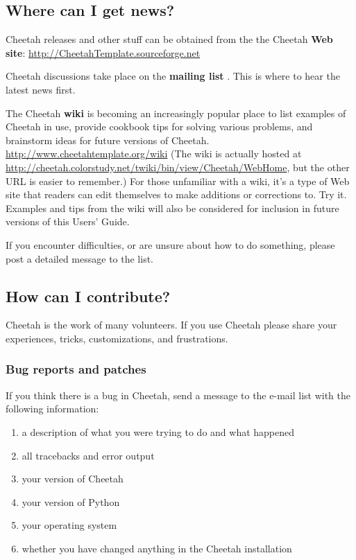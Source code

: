 \subsection{Where can I get news?}
\label{intro.news}

Cheetah releases and other stuff can be obtained from the the Cheetah 
{\bf Web site}:
\url{http://CheetahTemplate.sourceforge.net}

Cheetah discussions take place on the {\bf mailing list}
.  This is where to hear
the latest news first.

The Cheetah {\bf wiki} is becoming an increasingly popular place to list
examples of Cheetah in use, provide cookbook tips for solving various problems,
and brainstorm ideas for future versions of Cheetah.
\url{http://www.cheetahtemplate.org/wiki}
(The wiki is actually hosted at
\url{http://cheetah.colorstudy.net/twiki/bin/view/Cheetah/WebHome}, but the 
other URL is easier to remember.)
For those unfamiliar with a wiki, it's a type of Web site that readers can edit
themselves to make additions or corrections to.  Try it.  Examples and tips 
from the wiki will also be considered for inclusion in future versions of this
Users' Guide.

If you encounter difficulties, or are unsure about how to do something,
please post a detailed message to the list.  

\subsection{How can I contribute?}
\label{intro.contribute}

Cheetah is the work of many volunteers.  If you use Cheetah please share your
experiences, tricks, customizations, and frustrations.

\subsubsection{Bug reports and patches}

If you think there is a bug in Cheetah, send a message to the e-mail list
with the following information:

\begin{enumerate}
\item a description of what you were trying to do and what happened
\item all tracebacks and error output
\item your version of Cheetah
\item your version of Python
\item your operating system
\item whether you have changed anything in the Cheetah installation
\end{enumerate}

